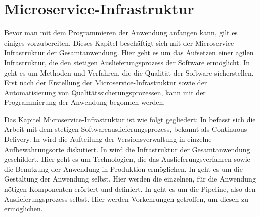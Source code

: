 \chapter{Microservice-Infrastruktur}
\label{chap:microserviceinfrastruktur}
Bevor man mit dem Programmieren der Anwendung anfangen kann,
gilt es einiges vorzubereiten. Dieses Kapitel beschäftigt sich
mit der Microservice-Infrastruktur der Gesamtanwendung. Hier geht
es um das Aufsetzen einer agilen Infrastruktur, die den
stetigen Auslieferungsprozess der Software ermöglicht. 
In  geht es um Methoden und Verfahren,
die die Qualität der Software sicherstellen. Erst nach der Erstellung
der Microservice-Infrastruktur sowie der Automatisierung von
Qualitätssicherungsprozessen, kann mit der Programmierung der
Anwendung begonnen werden.

Das Kapitel Microservice-Infrastruktur ist wie folgt gegliedert:
In  befasst sich die Arbeit mit
dem stetigen Softwareauslieferungsprozess, bekannt als Continuous Delivery.
In  wird die Aufteilung der Versionsverwaltung
in einzelne Aufbewahrungsorte diskutiert. In 
wird die Infrastruktur der Gesamtanwendung geschildert. Hier geht es
um Technologien, die das Auslieferungsverfahren sowie die Benutzung
der Anwendung in Produktion ermöglichen. In 
geht es um die Gestaltung der Anwendung selbst. Hier werden die einzelnen,
für die Anwendung nötigen Komponenten erörtert und definiert.
In  geht es um die Pipeline, also den Auslieferungsprozess
selbst. Hier werden Vorkehrungen getroffen, um diesen zu ermöglichen.

